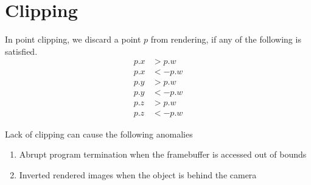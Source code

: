\section{Clipping}
In point clipping, we discard a point $p$ from rendering, if any of the following is satisfied.
\begin{equation}
\begin{aligned}
p.x &> p.w\\
p.x &< -p.w\\
p.y &> p.w\\
p.y &< -p.w\\
p.z &> p.w\\
p.z &< -p.w
\end{aligned}
\end{equation}

Lack of clipping can cause the following anomalies
\begin{enumerate}
 \item Abrupt program termination when the framebuffer is accessed out of bounds
 \item Inverted rendered images when the object is behind the camera
\end{enumerate}

\clearpage 